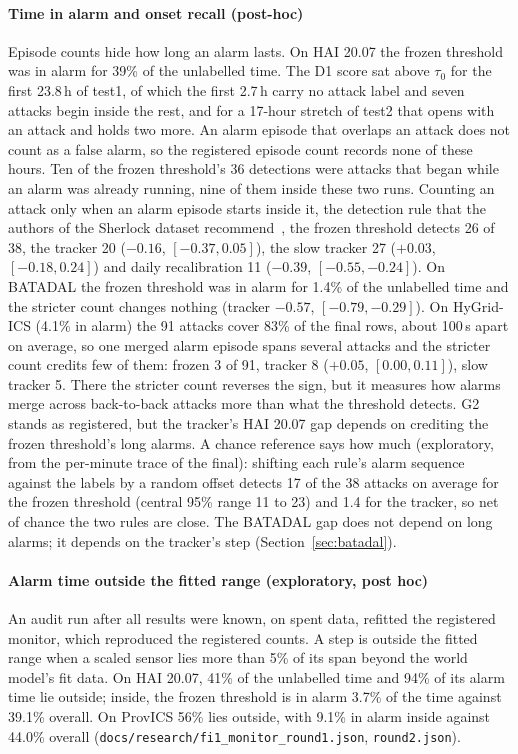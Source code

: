 \documentclass[letterpaper,twocolumn,10pt]{article}
\begin{document}
\paragraph{Time in alarm and onset recall (post-hoc)}
Episode counts hide how long an alarm lasts. On HAI 20.07 the frozen threshold was in alarm for 39\%
of the unlabelled time. The D1 score sat above $\tau_0$ for the first 23.8\,h of test1, of which the
first 2.7\,h carry no attack label and seven attacks begin inside the rest, and for a 17-hour stretch of test2 that opens with an attack and holds two more. An alarm episode that overlaps an attack does not count as a false
alarm, so the registered episode count records none of these hours. Ten of the frozen threshold's 36
detections were attacks that began while an alarm was already running, nine of them inside these two runs. Counting an attack
only when an alarm episode starts inside it, the detection rule that the authors of the Sherlock
dataset recommend~\cite{wagner2025sherlock}, the frozen threshold detects 26 of 38, the tracker 20
($-0.16$, $[-0.37, 0.05]$), the slow tracker 27 ($+0.03$, $[-0.18, 0.24]$) and daily recalibration 11 ($-0.39$, $[-0.55, -0.24]$). On BATADAL the frozen threshold was in alarm for 1.4\% of the unlabelled
time and the stricter count changes nothing (tracker $-0.57$, $[-0.79, -0.29]$). On HyGrid-ICS (4.1\%
in alarm) the 91 attacks cover 83\% of the final rows, about 100\,s apart on average, so one merged
alarm episode spans several attacks and the stricter count credits few of them: frozen 3 of 91,
tracker 8 ($+0.05$, $[0.00, 0.11]$), slow tracker 5. There the stricter count reverses the sign, but
it measures how alarms merge across back-to-back attacks more than what the threshold detects. G2
stands as registered, but the tracker's HAI 20.07 gap depends on crediting the frozen threshold's long
alarms. A chance reference says how much (exploratory, from the per-minute trace of the final): shifting
each rule's alarm sequence against the labels by a random offset detects 17 of the 38 attacks on
average for the frozen threshold (central 95\% range 11 to 23) and 1.4 for the tracker, so net
of chance the two rules are close. The BATADAL gap does not depend on long alarms; it depends on the
tracker's step (Section~\ref{sec:batadal}).

\paragraph{Alarm time outside the fitted range (exploratory, post hoc)}
An audit run after all results were known, on spent data, refitted the registered monitor, which
reproduced the registered counts. A step is outside the fitted range when a scaled sensor lies more
than 5\% of its span beyond the world model's fit data. On HAI 20.07, 41\% of the unlabelled time and
94\% of its alarm time lie outside; inside, the frozen threshold is in alarm 3.7\% of the time against
39.1\% overall. On ProvICS 56\% lies outside, with 9.1\% in alarm inside against 44.0\% overall
(\texttt{docs/research/fi1\_monitor\_round1.json}, \texttt{round2.json}).
\end{document}
